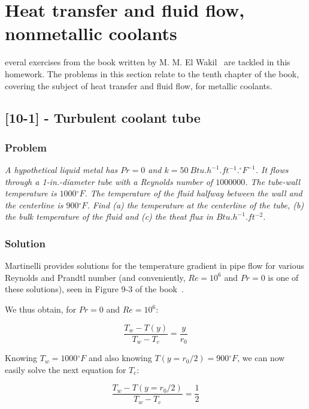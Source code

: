 %
%
\let\textcircled=\pgftextcircled
\chapter{Heat transfer and fluid flow, nonmetallic coolants}
\label{chap:intro}

everal exercises from the book written by M. M. El Wakil~\cite{book01} are tackled in this homework. The problems in this section relate to the tenth chapter of the book, covering the subject of heat transfer and fluid flow, for metallic coolants.

\section{[10-1] - Turbulent coolant tube}
\label{prob101}


\subsection{Problem}
\textit{A hypothetical liquid metal has $Pr = 0$ and $k = 50\ Btu.h^{-1}.ft^{-1}.{}^\circ F^{-1}$. It flows through a 1-in.-diameter tube with a Reynolds number of $1000000$. The tube-wall temperature is $1000{}^\circ F$. The temperature of the fluid halfway between the wall and the centerline is $900{}^\circ F$. Find (a) the temperature at the centerline of the tube, (b) the bulk temperature of the fluid and (c) the theat flux in $Btu.h^{-1}.ft^{-2}$.}

\subsection{Solution}

Martinelli provides solutions for the temperature gradient in pipe flow for various Reynolds and Prandtl number (and conveniently, $Re = 10^6$ and $Pr = 0$ is one of these solutions), seen in Figure 9-3 of the book~\cite{book01}.

We thus obtain, for $Pr=0$ and $Re = 10^6$:

\begin{equation}
\frac{T_w - T(y)}{T_w-T_c} = \frac{y}{r_0}
\end{equation}

Knowing $T_w = 1000{}^\circ F$ and also knowing $T(y=r_0/2) = 900{}^\circ F$, we can now easily solve the next equation for $T_c$:

\begin{equation}
\frac{T_w - T(y=r_0/2)}{T_w-T_c} = \frac{1}{2}
\end{equation}

